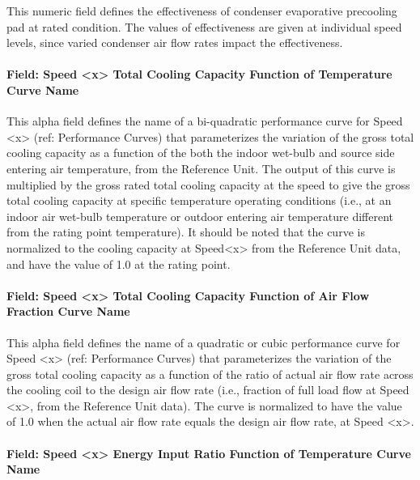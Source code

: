 This numeric field defines the effectiveness of condenser evaporative precooling pad at rated condition. The values of effectiveness are given at individual speed levels, since varied condenser air flow rates impact the effectiveness.

\paragraph{Field: Speed \textless{}x\textgreater{} Total Cooling Capacity Function of Temperature Curve Name}\label{field-speed-x-total-cooling-capacity-function-of-temperature-curve-name-1}

This alpha field defines the name of a bi-quadratic performance curve for Speed \textless{}x\textgreater{} (ref: Performance Curves) that parameterizes the variation of the gross total cooling capacity as a function of the both the indoor wet-bulb and source side entering air temperature, from the Reference Unit. The output of this curve is multiplied by the gross rated total cooling capacity at the speed to give the gross total cooling capacity at specific temperature operating conditions (i.e., at an indoor air wet-bulb temperature or outdoor entering air temperature different from the rating point temperature). It should be noted that the curve is normalized to the cooling capacity at Speed\textless{}x\textgreater{} from the Reference Unit data, and have the value of 1.0 at the rating point.

\paragraph{Field: Speed \textless{}x\textgreater{} Total Cooling Capacity Function of Air Flow Fraction Curve Name}\label{field-speed-x-total-cooling-capacity-function-of-air-flow-fraction-curve-name}

This alpha field defines the name of a quadratic or cubic performance curve for Speed \textless{}x\textgreater{} (ref: Performance Curves) that parameterizes the variation of the gross total cooling capacity as a function of the ratio of actual air flow rate across the cooling coil to the design air flow rate (i.e., fraction of full load flow at Speed \textless{}x\textgreater{}, from the Reference Unit data). The curve is normalized to have the value of 1.0 when the actual air flow rate equals the design air flow rate, at Speed \textless{}x\textgreater{}.

\paragraph{Field: Speed \textless{}x\textgreater{} Energy Input Ratio Function of Temperature Curve Name}\label{field-speed-x-energy-input-ratio-function-of-temperature-curve-name-1}

